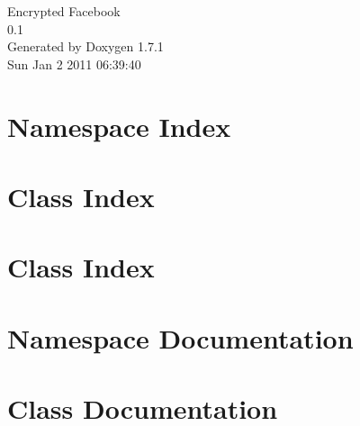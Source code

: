 \documentclass[a4paper]{book}
\begin{document}
\hypersetup{pageanchor=false}
\begin{titlepage}
\vspace*{7cm}
\begin{center}
{\Large Encrypted Facebook \\[1ex]\large 0.1 }\\
\vspace*{1cm}
{\large Generated by Doxygen 1.7.1}\\
\vspace*{0.5cm}
{\small Sun Jan 2 2011 06:39:40}\\
\end{center}
\end{titlepage}
\clearemptydoublepage
{}
\tableofcontents
\clearemptydoublepage
{}
\hypersetup{pageanchor=true}
\chapter{Namespace Index}

\chapter{Class Index}

\chapter{Class Index}

\chapter{Namespace Documentation}

\chapter{Class Documentation}











\printindex
\end{document}

